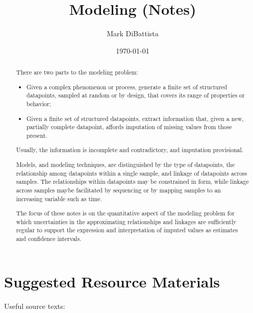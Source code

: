 \documentclass[12pt, twoside, draft]{article}
\begin{document}
\setpagewiselinenumbers


\title{Modeling (Notes)}

\footnotesize\date{\today}

\author{Mark DiBattista}

\maketitle

\begin{abstract}
There are two parts to the modeling problem:
\begin{itemize}[noitemsep]
\item Given a complex phenomenon or process, generate a finite set of structured datapoints, sampled at random or by design, that covers its range of properties or behavior;
\item Given a finite set of structured datapoints, extract information that, given a new, partially complete datapoint, affords imputation of missing values from those present.
\end{itemize}
Usually, the information is incomplete and contradictory, and imputation provisional.

Models, and modeling techniques, are distinguished by the type of datapoints, the relationship among datapoints within a single sample, and linkage of datapoints across samples.  The relationships within datapoints may be constrained in form, while linkage across samples maybe  facilitated by sequencing or by mapping samples to an increasing variable such as time. 

The focus of these notes is on the quantitative aspect of the modeling problem for which uncertainties in the approximating relationships and linkages are sufficiently regular to support the expression and interpretation of imputed values as estimates and confidence intervals. 


\end{abstract}


\section{Suggested Resource Materials}
Useful source texts:
\end{document}
